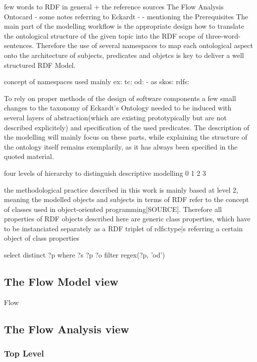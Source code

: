 \documentclass[a4paper,11pt]{article}
\begin{document}
    few words to RDF in general + the reference sources    
    The Flow Analysis Ontocard
        - some notes referring to Eckardt
            - 
        - mentioning the Prerequisites
        The main part of the modelling workflow is the appropriate design how to translate the ontological structure of the given topic into the RDF scope
        of three-word-sentences. Therefore the use of several namespaces to map each ontological aspect onto the architecture of subjects, predicates and 
        objetcs is key to deliver a well structured RDF Model. 


        concept of namespaces used mainly
        ex:
        tc:
        od: - as 
        skos:
        rdfs:
        \cite{HGGS}

        To rely on proper methods of the design of software components a few small changes to the taxonomy of Eckardt's Ontology needed to be induced with
        several layers of abstraction(which are existing prototypically but are not described explicitely) and specification of the used predicates. 
        The description of the modelling will mainly focus on these parts, while explaining the structure of the ontology itself remains exemplarily, 
        as it has always been specified in the quoted material.

        four levels of hierarchy to distinguish descriptive modelling 
        0
        1
        2
        3

        the methodological practice described in this work is mainly based at level 2, meaning the modelled objects and subjects in terms of RDF refer to 
        the concept of classes used in object-oriented programming[SOURCE]. Therefore all properties of RDF objects described here are generic class
        properties, which have to be instanciated separately as a RDF triplet of rdfs:type|s referring a certain object of class properties

        \cite{HGGA}

        select distinct ?p where {?s ?p ?o filter regex(?p, 'od')} 
        \subsection{The Flow Model view}
        Flow 
        \subsection{The Flow Analysis view}
            \subsubsection{Top Level}
\end{document}
